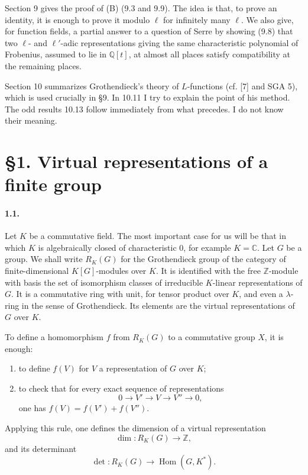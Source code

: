 \documentclass[10pt,letterpaper]{article}
\newcommand{\C}{\mathbb C}
\newcommand{\Q}{\mathbb Q}
\newcommand{\Z}{\mathbb Z}
\newcommand{\Hom}{\operatorname{Hom}}
\providecommand{\Hom}{\operatorname{Hom}}
\providecommand{\Hom}{\operatorname{Hom}}
\providecommand{\Hom}{\operatorname{Hom}}
\begin{document}
Section 9 gives the proof of (B) (9.3 and 9.9). The idea is that, to prove an identity, it is enough to prove it modulo \(\ell\) for infinitely many \(\ell\). We also give, for function fields, a partial answer to a question of Serre by showing (9.8) that two \(\ell\)- and \(\ell'\)-adic representations giving the same characteristic polynomial of Frobenius, assumed to lie in \(\Q[t]\), at almost all places satisfy compatibility at the remaining places.

Section 10 summarizes Grothendieck's theory of \(L\)-functions (cf. [7] and SGA 5), which is used crucially in §9. In 10.11 I try to explain the point of his method. The odd results 10.13 follow immediately from what precedes. I do not know their meaning.

\section*{\S1. Virtual representations of a finite group}

\paragraph{1.1.} Let \(K\) be a commutative field. The most important case for us will be that in which \(K\) is algebraically closed of characteristic \(0\), for example \(K=\C\). Let \(G\) be a group. We shall write \(R_K(G)\) for the Grothendieck group of the category of finite-dimensional \(K[G]\)-modules over \(K\). It is identified with the free \(\Z\)-module with basis the set of isomorphism classes of irreducible \(K\)-linear representations of \(G\). It is a commutative ring with unit, for tensor product over \(K\), and even a \(\lambda\)-ring in the sense of Grothendieck. Its elements are the virtual representations of \(G\) over \(K\).

To define a homomorphism \(f\) from \(R_K(G)\) to a commutative group \(X\), it is enough:
\begin{enumerate}[label=\alph*)]
\item to define \(f(V)\) for \(V\) a representation of \(G\) over \(K\);
\item to check that for every exact sequence of representations
\[
0\longrightarrow V'\longrightarrow V\longrightarrow V''\longrightarrow0,
\]
one has \(f(V)=f(V')+f(V'')\).
\end{enumerate}
Applying this rule, one defines the dimension of a virtual representation
\[
\dim:R_K(G)\longrightarrow\Z,
\]
and its determinant
\[
\det:R_K(G)\longrightarrow\Hom(G,K^*).
\]
\end{document}
